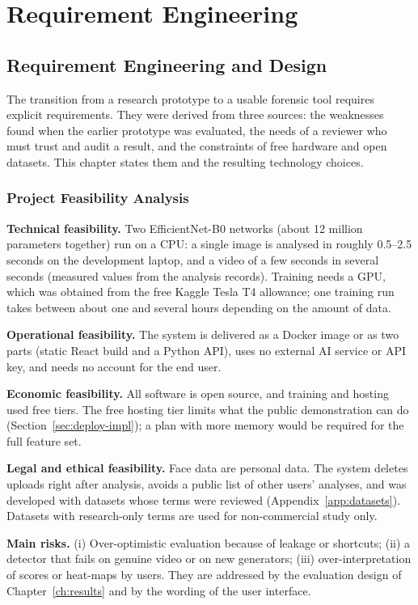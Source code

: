 \chapter{Requirement Engineering}
\label{ch:req}

\section{Requirement Engineering and Design}
The transition from a research prototype to a usable forensic tool requires explicit requirements. They were derived from three sources:
the weaknesses found when the earlier prototype was evaluated, the needs of a reviewer who must trust and audit a result, and the
constraints of free hardware and open datasets. This chapter states them and the resulting technology choices.

\subsection{Project Feasibility Analysis}
\textbf{Technical feasibility.} Two EfficientNet-B0 networks (about 12 million parameters together) run on a CPU: a single image is
analysed in roughly 0.5--2.5 seconds on the development laptop, and a video of a few seconds in several seconds (measured values from the
analysis records). Training needs a GPU, which was obtained from the free Kaggle Tesla T4 allowance; one training run takes between about
one and several hours depending on the amount of data.

\textbf{Operational feasibility.} The system is delivered as a Docker image or as two parts (static React build and a Python API), uses no
external AI service or API key, and needs no account for the end user.

\textbf{Economic feasibility.} All software is open source, and training and hosting used free tiers. The free hosting tier limits what the
public demonstration can do (Section~\ref{sec:deploy-impl}); a plan with more memory would be required for the full feature set.

\textbf{Legal and ethical feasibility.} Face data are personal data. The system deletes uploads right after analysis, avoids a public list
of other users' analyses, and was developed with datasets whose terms were reviewed (Appendix~\ref{app:datasets}). Datasets with research-only
terms are used for non-commercial study only.

\textbf{Main risks.} (i) Over-optimistic evaluation because of leakage or shortcuts; (ii) a detector that fails on genuine video or on new
generators; (iii) over-interpretation of scores or heat-maps by users. They are addressed by the evaluation design of
Chapter~\ref{ch:results} and by the wording of the user interface.

